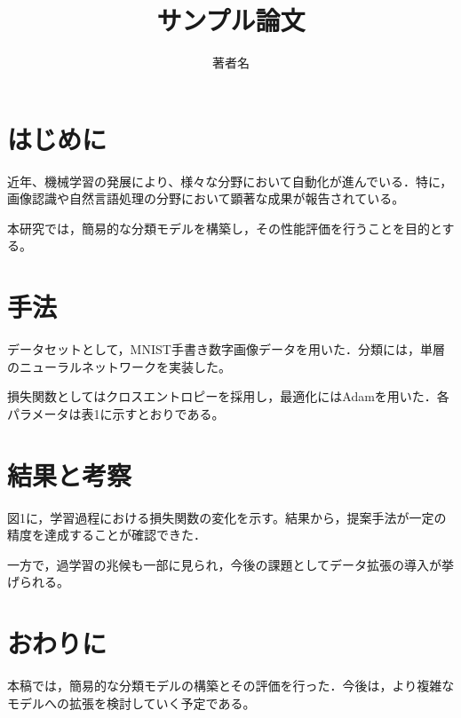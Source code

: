 \documentclass{article}
\title{サンプル論文}
\author{著者名}
\date{}
\begin{document}
\maketitle

\section{はじめに}
近年、機械学習の発展により、様々な分野において自動化が進んでいる．特に，画像認識や自然言語処理の分野において顕著な成果が報告されている。

本研究では，簡易的な分類モデルを構築し，その性能評価を行うことを目的とする。

\section{手法}
データセットとして，MNIST手書き数字画像データを用いた．分類には，単層のニューラルネットワークを実装した。

損失関数としてはクロスエントロピーを採用し，最適化にはAdamを用いた．各パラメータは表1に示すとおりである。

\section{結果と考察}
図1に，学習過程における損失関数の変化を示す。結果から，提案手法が一定の精度を達成することが確認できた．

一方で，過学習の兆候も一部に見られ，今後の課題としてデータ拡張の導入が挙げられる。

\section{おわりに}
本稿では，簡易的な分類モデルの構築とその評価を行った．今後は，より複雑なモデルへの拡張を検討していく予定である。
\end{document}
